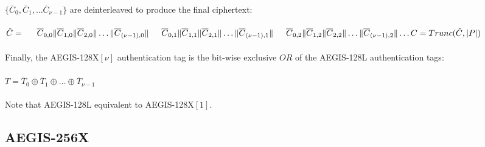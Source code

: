 \documentclass[envcountsame,runningheads,notitlepage]{llncs}
\begin{document}
\paragraph{}

$\{ \overline{C}_0, \overline{C}_1, \ldots \overline{C}_{\nu-1} \}$ are deinterleaved to produce the final ciphertext:

\paragraph{}

\begin{math}
  \hat{C} = \\
  \indent \overline{C}_{0,0} \| \overline{C}_{1,0} \| \overline{C}_{2,0} \| \ldots \| \overline{C}_{(\nu-1),0} \| \\
  \indent \overline{C}_{0,1} \| \overline{C}_{1,1} \| \overline{C}_{2,1} \| \ldots \| \overline{C}_{(\nu-1),1} \| \\
  \indent \overline{C}_{0,2} \| \overline{C}_{1,2} \| \overline{C}_{2,2} \| \ldots \| \overline{C}_{(\nu-1),2} \| \ldots \\
  \\
  C = Trunc(\hat{C}, \lvert P \rvert)
\end{math}

\paragraph{}

Finally, the AEGIS-128X$[\nu]$ authentication tag is the bit-wise exclusive $OR$ of the AEGIS-128L authentication tags:

\paragraph{}

\begin{math}
  T = \overline{T}_0 \oplus \overline{T}_1 \oplus \ldots \oplus \overline{T}_{\nu-1}
\end{math}

\paragraph{}

Note that AEGIS-128L equivalent to AEGIS-128X$[1]$.

\subsection{AEGIS-256X}
\end{document}
